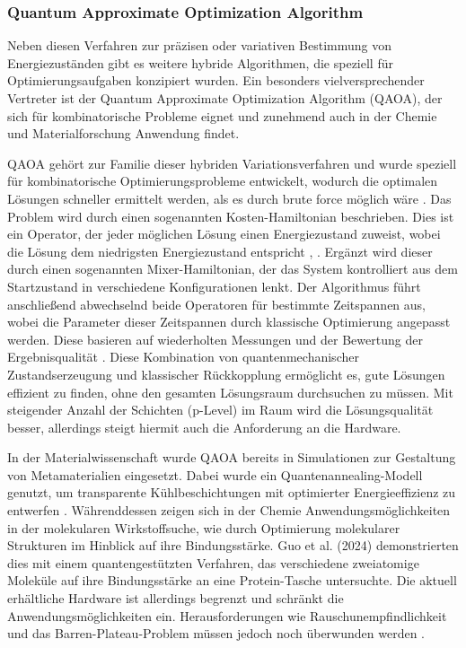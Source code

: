 \subsubsection*{Quantum Approximate Optimization Algorithm}

Neben diesen Verfahren zur präzisen oder variativen Bestimmung von Energiezuständen gibt es weitere hybride Algorithmen, die speziell für Optimierungsaufgaben konzipiert wurden. Ein besonders vielversprechender Vertreter ist der Quantum Approximate Optimization Algorithm (QAOA), der sich für kombinatorische Probleme eignet und zunehmend auch in der Chemie und Materialforschung Anwendung findet.

QAOA gehört zur Familie dieser hybriden Variationsverfahren und wurde speziell für kombinatorische Optimierungsprobleme entwickelt, wodurch die optimalen Lösungen schneller ermittelt werden, als es durch brute force möglich wäre \citealp[3]{guoHarnessingQuantumPower2024}. Das Problem wird durch einen sogenannten Kosten-Hamiltonian beschrieben. Dies ist ein Operator, der jeder möglichen Lösung einen Energiezustand zuweist, wobei die Lösung dem niedrigsten Energiezustand entspricht \citealp[24]{mottaEmergingQuantumComputing2022}, \citealp[8]{guoHarnessingQuantumPower2024}. Ergänzt wird dieser durch einen sogenannten Mixer-Hamiltonian, der das System kontrolliert aus dem Startzustand in verschiedene Konfigurationen lenkt. Der Algorithmus führt anschließend abwechselnd beide Operatoren für bestimmte Zeitspannen aus, wobei die Parameter dieser Zeitspannen durch klassische Optimierung angepasst werden. Diese basieren auf wiederholten Messungen und der Bewertung der Ergebnisqualität \citealp[8]{guoHarnessingQuantumPower2024}.
Diese Kombination von quantenmechanischer Zustandserzeugung und klassischer Rückkopplung ermöglicht es, gute Lösungen effizient zu finden, ohne den gesamten Lösungsraum durchsuchen zu müssen. Mit steigender Anzahl der Schichten (p-Level) im Raum wird die Lösungsqualität besser, allerdings steigt hiermit auch die Anforderung an die Hardware.

In der Materialwissenschaft wurde QAOA bereits in Simulationen zur Gestaltung von Metamaterialien eingesetzt. Dabei wurde ein Quantenannealing-Modell genutzt, um transparente Kühlbeschichtungen mit optimierter Energieeffizienz zu entwerfen \citealp[18]{guoHarnessingQuantumPower2024}. Währenddessen zeigen sich in der Chemie Anwendungsmöglichkeiten in der molekularen Wirkstoffsuche, wie durch Optimierung molekularer Strukturen im Hinblick auf ihre Bindungsstärke. Guo et al. (2024) demonstrierten dies mit einem quantengestützten Verfahren, das verschiedene zweiatomige Moleküle auf ihre Bindungsstärke an eine Protein-Tasche untersuchte. Die aktuell erhältliche Hardware ist allerdings begrenzt und schränkt die Anwendungsmöglichkeiten ein. Herausforderungen wie Rauschunempfindlichkeit und das Barren-Plateau-Problem müssen jedoch noch überwunden werden \citealp[12]{weidmanQuantumComputingChemistry2024a}.


